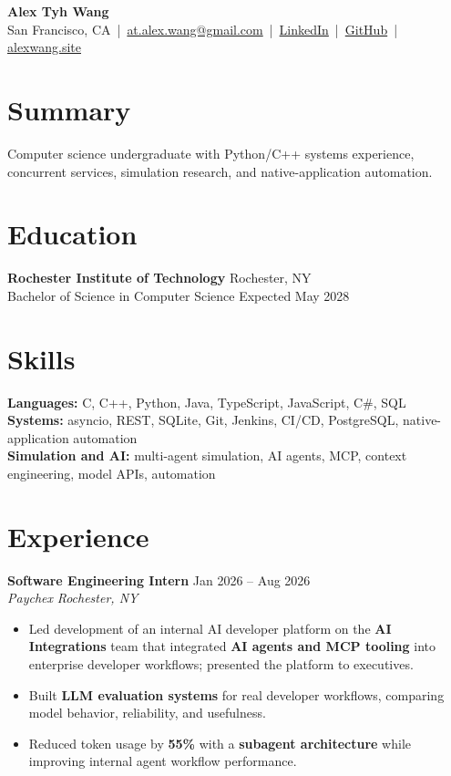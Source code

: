 \documentclass[10pt,letterpaper]{article}
\newif\ifresumeFirstRole
\newcommand{\resumeRole}[4]{%
  \ifresumeFirstRole
    \global\resumeFirstRolefalse
  \else
    \vspace{0pt plus 1fill}%
  \fi
  \textbf{#1} \hfill #2\\
  \textit{#3} \hfill \textit{#4}
}
\begin{document}
\begin{center}
{\Large \textbf{Alex Tyh Wang}}\\
San Francisco, CA \,|\, \href{mailto:at.alex.wang@gmail.com}{at.alex.wang@gmail.com} \,|\, \href{https://www.linkedin.com/in/alex-tyh-wang/}{LinkedIn} \,|\, \href{https://github.com/alextyhwang}{GitHub} \,|\, \href{https://alexwang.site}{alexwang.site}
\end{center}

\section*{Summary}
Computer science undergraduate with Python/C++ systems experience, concurrent services, simulation research, and native-application automation.

\section*{Education}
\textbf{Rochester Institute of Technology} \hfill Rochester, NY\\
Bachelor of Science in Computer Science \hfill Expected May 2028

\section*{Skills}
\textbf{Languages:} C, C++, Python, Java, TypeScript, JavaScript, C\#, SQL\\
\textbf{Systems:} asyncio, REST, SQLite, Git, Jenkins, CI/CD, PostgreSQL, native-application automation\\
\textbf{Simulation and AI:} multi-agent simulation, AI agents, MCP, context engineering, model APIs, automation

\section*{Experience}
\resumeRole{Software Engineering Intern}{Jan 2026 -- Aug 2026}{Paychex}{Rochester, NY}
\begin{itemize}
  \item Led development of an internal AI developer platform on the \textbf{AI Integrations} team that integrated \textbf{AI agents and MCP tooling} into enterprise developer workflows; presented the platform to executives.
  \item Built \textbf{LLM evaluation systems} for real developer workflows, comparing model behavior, reliability, and usefulness.
  \item Reduced token usage by \textbf{55\%} with a \textbf{subagent architecture} while improving internal agent workflow performance.
\end{itemize}
\end{document}
